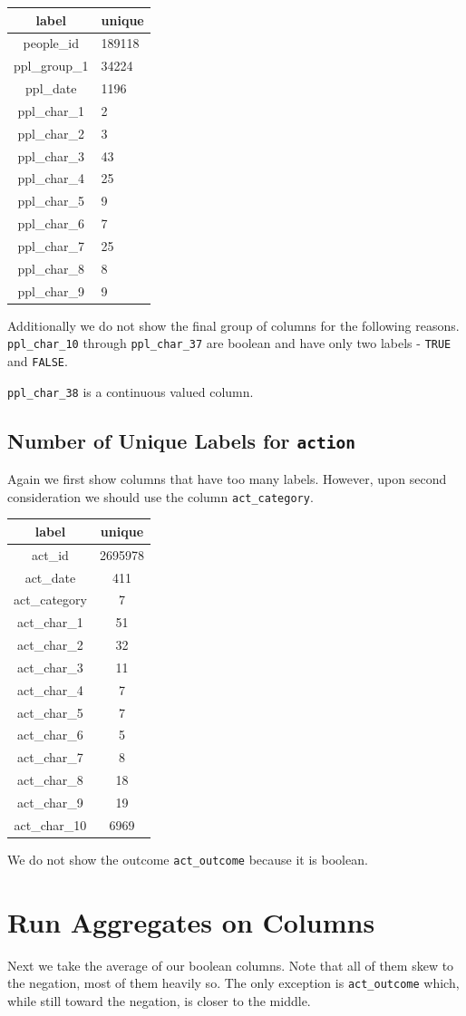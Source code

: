 \documentclass[]{report}
\begin{document}
\begin{longtable}[]{@{}cl@{}}
\toprule
label & unique\tabularnewline
\midrule
\endhead
people\_id & 189118\tabularnewline
ppl\_group\_1 & 34224\tabularnewline
ppl\_date & 1196\tabularnewline
ppl\_char\_1 & 2\tabularnewline
ppl\_char\_2 & 3\tabularnewline
ppl\_char\_3 & 43\tabularnewline
ppl\_char\_4 & 25\tabularnewline
ppl\_char\_5 & 9\tabularnewline
ppl\_char\_6 & 7\tabularnewline
ppl\_char\_7 & 25\tabularnewline
ppl\_char\_8 & 8\tabularnewline
ppl\_char\_9 & 9\tabularnewline
\bottomrule
\end{longtable}

Additionally we do not show the final group of columns for the following
reasons. \texttt{ppl\_char\_10} through \texttt{ppl\_char\_37} are
boolean and have only two labels - \texttt{TRUE} and \texttt{FALSE}.

\texttt{ppl\_char\_38} is a continuous valued column.

\section{\texorpdfstring{Number of Unique Labels for
\texttt{action}}{Number of Unique Labels for action}}\label{number-of-unique-labels-for-action}

Again we first show columns that have too many labels. However, upon
second consideration we should use the column \texttt{act\_category}.

\begin{longtable}[]{@{}cc@{}}
\toprule
label & unique\tabularnewline
\midrule
\endhead
act\_id & 2695978\tabularnewline
act\_date & 411\tabularnewline
act\_category & 7\tabularnewline
act\_char\_1 & 51\tabularnewline
act\_char\_2 & 32\tabularnewline
act\_char\_3 & 11\tabularnewline
act\_char\_4 & 7\tabularnewline
act\_char\_5 & 7\tabularnewline
act\_char\_6 & 5\tabularnewline
act\_char\_7 & 8\tabularnewline
act\_char\_8 & 18\tabularnewline
act\_char\_9 & 19\tabularnewline
act\_char\_10 & 6969\tabularnewline
\bottomrule
\end{longtable}

We do not show the outcome \texttt{act\_outcome} because it is boolean.

\chapter{Run Aggregates on Columns}\label{run-aggregates-on-columns}

Next we take the average of our boolean columns. Note that all of them
skew to the negation, most of them heavily so. The only exception is
\texttt{act\_outcome} which, while still toward the negation, is closer
to the middle.
\end{document}
